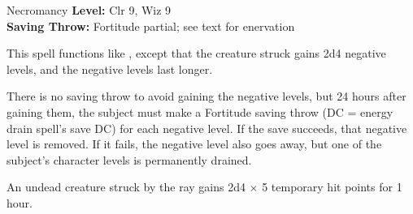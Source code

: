 {Necromancy}
{
	\textbf{Level:}
	Clr 9, Wiz 9\\
	\textbf{Saving Throw:}
	Fortitude partial; see text for enervation\\
}
{
	This spell functions like , except that the creature struck gains 2d4 negative levels, and the negative levels last longer.

	There is no saving throw to avoid gaining the negative levels, but 24 hours after gaining them, the subject must make a Fortitude saving throw (DC = energy drain spell's save DC) for each negative level. If the save succeeds, that negative level is removed. If it fails, the negative level also goes away, but one of the subject's character levels is permanently drained.

	An undead creature struck by the ray gains 2d4 $\times$ 5 temporary hit points for 1 hour.

}
